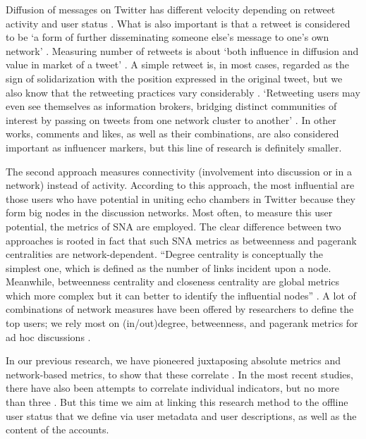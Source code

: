 Diffusion of messages on Twitter has different velocity depending on retweet activity \cite{BastosRaimundoTravitzki} and user status \cite{LarssonMoe,CollianderMarderFalkman}. What is also important is that a retweet is considered to be ‘a form of further disseminating someone else’s message to one’s own network’ \cite{GroshekTandoc,MascaroGoggins}. Measuring number of retweets is about ‘both influence in diffusion and value in market of a tweet’ \cite[p. 792]{LiuShiChen}. A simple retweet is, in most cases, regarded as the sign of solidarization with the position expressed in the original tweet, but we also know that the retweeting practices vary considerably \cite{BoydGolderLotan}. ‘Retweeting users may even see themselves as information brokers, bridging distinct communities of interest by passing on tweets from one network cluster to another’ \cite{BrunsBurgees2012}. In other works, comments and likes, as well as their combinations, are also considered important as influencer markers, but this line of research is definitely smaller.

The second approach measures connectivity (involvement into discussion or in a network) instead of activity. According to this approach, the most influential are those users who have potential in uniting echo chambers in Twitter because they form big nodes in the discussion networks. Most often, to measure this user potential, the metrics of SNA are employed. The clear difference between two approaches is rooted in fact that such SNA metrics as betweenness and pagerank centralities are network-dependent. “Degree centrality is conceptually the simplest one, which is defined as the number of links incident upon a node. Meanwhile, betweenness centrality and closeness centrality are global metrics which more complex but it can better to identify the influential nodes” \cite{Maharani}. A lot of combinations of network measures have been offered by researchers to define the top users; we rely most on (in/out)degree, betweenness, and pagerank metrics for ad hoc discussions \cite{BodrunovaLitvinenkoNigmatullina}.

In our previous research, we have pioneered juxtaposing absolute metrics and network-based metrics, to show that these correlate \cite{BodrunovaLitvinenkoNigmatullina,BodrunovaLitvinenkoBlekanov2016}. In the most recent studies, there have also been attempts to correlate individual indicators, but no more than three \cite{GroshekTandoc}. But this time we aim at linking this research method to the offline user status that we define via user metadata and user descriptions, as well as the content of the accounts.

